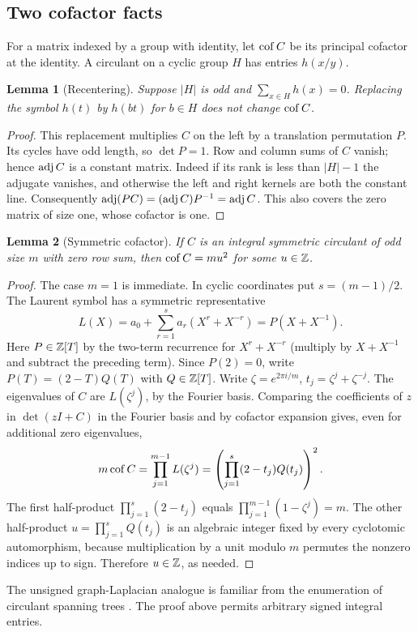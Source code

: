 \documentclass[11pt,a4paper]{article}
\newtheorem{SourceRcbRlemma}{Lemma}
\begin{document}
\subsection{Two cofactor facts}
For a matrix indexed by a group with identity, let $\operatorname{cof} C$ be its principal cofactor at the identity. A circulant on a cyclic group $H$ has entries $h(x/y)$.
\begin{SourceRcbRlemma}[Recentering]
Suppose $|H|$ is odd and $\sum_{x\in H}h(x)=0$. Replacing the symbol $h(t)$ by $h(bt)$ for $b\in H$ does not change $\operatorname{cof} C$.
\end{SourceRcbRlemma}
\begin{proof}
This replacement multiplies $C$ on the left by a translation permutation $P$. Its cycles have odd length, so $\det P=1$. Row and column sums of $C$ vanish; hence $\operatorname{adj} C$ is a constant matrix. Indeed if its rank is less than $|H|-1$ the adjugate vanishes, and otherwise the left and right kernels are both the constant line. Consequently $\operatorname{adj}(PC)=(\operatorname{adj} C)P^{-1}=\operatorname{adj} C$. This also covers the zero matrix of size one, whose cofactor is one.
\end{proof}
\begin{SourceRcbRlemma}[Symmetric cofactor]
If $C$ is an integral symmetric circulant of odd size $m$ with zero row sum, then $\operatorname{cof} C=m u^2$ for some $u\in\mathbb Z$.
\end{SourceRcbRlemma}
\begin{proof}
The case $m=1$ is immediate. In cyclic coordinates put $s=(m-1)/2$. The Laurent symbol has a symmetric representative
\[
 L(X)=a_0+\sum_{r=1}^{s}a_r(X^r+X^{-r})=P(X+X^{-1}).
\]
Here $P\in\mathbb Z[T]$ by the two-term recurrence for $X^r+X^{-r}$ (multiply by $X+X^{-1}$ and subtract the preceding term). Since $P(2)=0$, write $P(T)=(2-T)Q(T)$ with $Q\in\mathbb Z[T]$. Write $\zeta=e^{2\pi i/m}$, $t_j=\zeta^j+\zeta^{-j}$. The eigenvalues of $C$ are $L(\zeta^j)$, by the Fourier basis. Comparing the coefficients of $z$ in $\det(zI+C)$ in the Fourier basis and by cofactor expansion gives, even for additional zero eigenvalues,
\[
 m\operatorname{cof} C=\prod_{j=1}^{m-1}L(\zeta^j)
 =\left(\prod_{j=1}^{s}(2-t_j)Q(t_j)\right)^2 .
\]
The first half-product $\prod_{j=1}^{s}(2-t_j)$ equals $\prod_{j=1}^{m-1}(1-\zeta^j)=m$. The other half-product $u=\prod_{j=1}^s Q(t_j)$ is an algebraic integer fixed by every cyclotomic automorphism, because multiplication by a unit modulo $m$ permutes the nonzero indices up to sign. Therefore $u\in\mathbb Z$, as needed.
\end{proof}
The unsigned graph-Laplacian analogue is familiar from the enumeration of circulant spanning trees \cite{R21R:Trees}. The proof above permits arbitrary signed integral entries.
\end{document}
